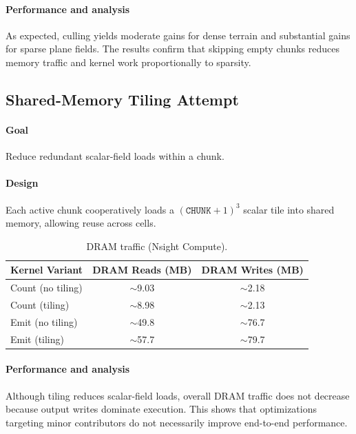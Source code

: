\documentclass[11pt,a4paper]{article}
\begin{document}
\paragraph{Performance and analysis}
As expected, culling yields moderate gains for dense terrain and substantial gains for sparse plane fields. The results confirm that skipping empty chunks reduces memory traffic and kernel work proportionally to sparsity.

\subsection{Shared-Memory Tiling Attempt}

\paragraph{Goal}
Reduce redundant scalar-field loads within a chunk.

\paragraph{Design}
Each active chunk cooperatively loads a $(\texttt{CHUNK}+1)^3$ scalar tile into
shared memory, allowing reuse across cells.

\begin{table}[H]
\centering
\caption{DRAM traffic (Nsight Compute).}
\label{tab:opt3a_dram}
\begin{tabular}{lcc}
\toprule
Kernel Variant & DRAM Reads (MB) & DRAM Writes (MB) \\
\midrule
Count (no tiling) & $\sim$9.03 & $\sim$2.18 \\
Count (tiling)    & $\sim$8.98 & $\sim$2.13 \\
Emit (no tiling)  & $\sim$49.8 & $\sim$76.7 \\
Emit (tiling)     & $\sim$57.7 & $\sim$79.7 \\
\bottomrule
\end{tabular}
\end{table}

\paragraph{Performance and analysis}
Although tiling reduces scalar-field loads, overall DRAM traffic does not decrease because output writes dominate execution. This shows that optimizations targeting minor contributors do not necessarily improve end-to-end performance.
\end{document}
